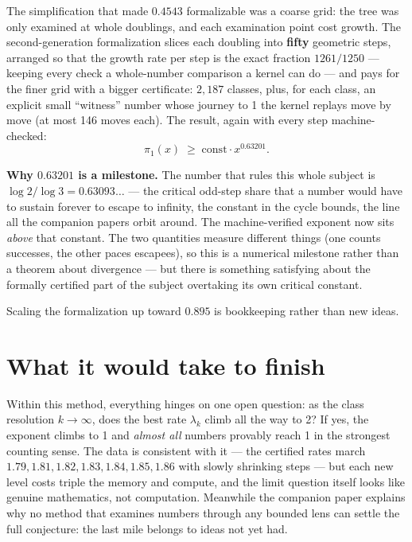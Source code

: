 \documentclass[11pt]{article}
\begin{document}
The simplification that made $0.4543$ formalizable was a coarse grid:
the tree was only examined at whole doublings, and each examination
point cost growth. The second-generation formalization slices each
doubling into \textbf{fifty} geometric steps, arranged so that the
growth rate per step is the exact fraction $1261/1250$ --- keeping
every check a whole-number comparison a kernel can do --- and pays for
the finer grid with a bigger certificate: $2{,}187$ classes, plus, for
each class, an explicit small ``witness'' number whose journey to 1 the
kernel replays move by move (at most 146 moves each). The result, again
with every step machine-checked:
\[
\pi_1(x) \;\geq\; \text{const} \cdot x^{0.63201}.
\]

\begin{keyidea}
\textbf{Why $0.63201$ is a milestone.} The number that rules this whole
subject is $\log 2/\log 3 = 0.63093\ldots$ --- the critical odd-step
share that a number would have to sustain forever to escape to
infinity, the constant in the cycle bounds, the line all the companion
papers orbit around. The machine-verified exponent now sits
\emph{above} that constant. The two quantities measure different things
(one counts successes, the other paces escapees), so this is a
numerical milestone rather than a theorem about divergence --- but
there is something satisfying about the formally certified part of the
subject overtaking its own critical constant.
\end{keyidea}

Scaling the formalization up toward $0.895$ is bookkeeping rather than
new ideas.

\section{What it would take to finish}

Within this method, everything hinges on one open question: as the
class resolution $k \to \infty$, does the best rate $\lambda_k$ climb
all the way to 2? If yes, the exponent climbs to 1 and \emph{almost
all} numbers provably reach 1 in the strongest counting sense. The
data is consistent with it --- the certified rates march
$1.79, 1.81, 1.82, 1.83, 1.84, 1.85, 1.86$ with slowly shrinking steps
--- but each new level costs triple the memory and compute, and the
limit question itself looks like genuine mathematics, not computation.
Meanwhile the companion paper explains why no method that examines
numbers through any bounded lens can settle the full conjecture: the
last mile belongs to ideas not yet had.
\end{document}

